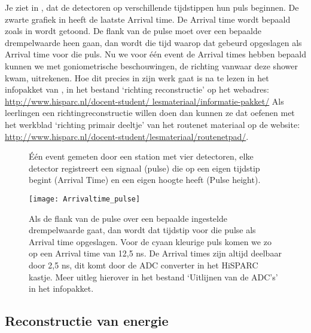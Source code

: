 Je ziet in , dat de detectoren op
verschillende tijdstippen hun puls beginnen. De zwarte grafiek in
 heeft de laatste Arrival time. De Arrival
time wordt bepaald zoals in  wordt getoond. 
De flank van de pulse moet over een bepaalde drempelwaarde heen gaan,
dan wordt die tijd waarop dat gebeurd opgeslagen als Arrival time voor
die puls. Nu we voor één event de Arrival times hebben bepaald kunnen we
met goniometrische beschouwingen, de richting vanwaar deze shower kwam, uitrekenen.
Hoe dit precies in zijn werk gaat is na te lezen in het infopakket van
\hisparc, in het bestand `richting reconstructie' op het webadres:
\url{http://www.hisparc.nl/docent-student/
lesmateriaal/informatie-pakket/} Als leerlingen een richtingreconstructie willen doen
dan kunnen ze dat oefenen met het werkblad `richting primair deeltje' van het routenet
materiaal op de website: \url{http://www.hisparc.nl/docent-student/lesmateriaal/routenetpad/}.

\begin{figure}
    \centering
    
    \caption{Één event gemeten door een station met vier detectoren, elke detector registreert
    een signaal (pulse) die op een eigen tijdstip begint (Arrival Time) en een eigen hoogte heeft
    (Pulse height).}
    \label{fig:traces}
\end{figure}


\begin{figure}
    \centering
    \texttt{[image: Arrivaltime\_pulse]}
    \caption{Als de flank van de pulse over een bepaalde ingestelde
    drempelwaarde gaat, dan wordt dat tijdstip voor die pulse als Arrival
    time opgeslagen. Voor de cyaan kleurige puls komen we zo op een Arrival
    time van 12,5 ns. De Arrival times zijn altijd deelbaar door 2,5 ns, dit
    komt door de ADC converter in het HiSPARC kastje. Meer uitleg hierover
    in het bestand `Uitlijnen van de ADC's' in het \hisparc infopakket.}
    \label{fig:Arrivaltime_pulse}
\end{figure}


\subsection{Reconstructie van energie }

